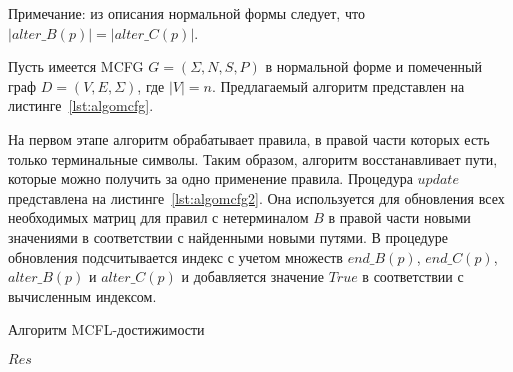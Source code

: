 Примечание: из описания нормальной формы следует, что $|alter\_B(p)| = |alter\_C(p)|$.

Пусть имеется MCFG $G = (\Sigma, N, S, P)$ в нормальной форме и помеченный граф $D = (V, E, \Sigma)$, где $|V| = n$. Предлагаемый алгоритм представлен на листинге~\ref{lst:algomcfg}.

На первом этапе алгоритм обрабатывает правила, в правой части которых есть только терминальные символы. Таким образом, алгоритм восстанавливает пути, которые можно получить за одно применение правила. Процедура $update$ представлена на листинге~\ref{lst:algomcfg2}. Она используется для обновления всех необходимых матриц для правил с нетерминалом $B$ в правой части новыми значениями в соответствии с найденными новыми путями. В процедуре обновления подсчитывается индекс с учетом множеств $end\_B(p)$, $end\_C(p)$, $alter\_B(p)$ и $alter\_C(p)$ и добавляется значение $True$ в соответствии с вычисленным индексом.

\begin{algorithm}[H]
	\footnotesize
	\begin{algorithmic}[1]
		\caption{Алгоритм MCFL-достижимости}
		\label{lst:algomcfg}
		
		\EndFor
		\EndFor
		
		 
		\EndFor
		
		 
		 
		
		\EndFor
		\EndFor
		\EndWhile
		 
		\EndFor
		\EndFor
		\Return $Res$
		\EndProcedure
		
		
		
	\end{algorithmic}
\end{algorithm}

